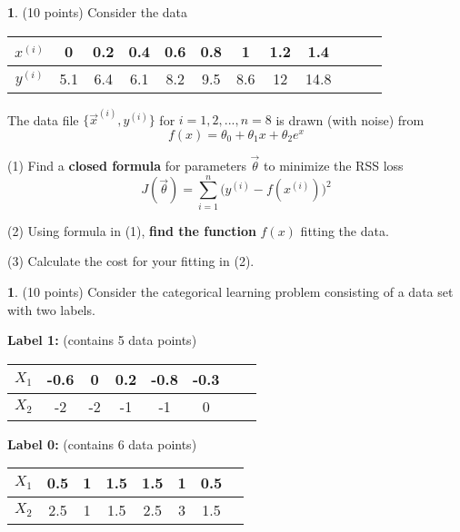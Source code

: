 \documentclass[11pt]{paper}
\theoremstyle{definition}
\newtheorem{Question}[theorem]{ }
\newcommand{\Qu}[1]{
\begin{Question}
#1
\end{Question}
\vspace{-0.5cm}
}
\newcommand{\vx}{\vec{x}}
\begin{document}
 
\vfill





\newpage


 
 \Qu{ (10 points)
 Consider the data 
  \begin{tabular}{c|c|c|c|c|c|c|c|c|c|c|c}
 $x^{(i)}$   &  0 &  0.2&  0.4& 0.6&  0.8& 1&  1.2 & 1.4 \\ \hline
 $y^{(i)}$  &  5.1  & 6.4& 6.1 & 8.2& 9.5  &  8.6  & 12 & 14.8\\
\end{tabular}
 
The  data file $\{ \vx^{(i)}, y^{(i)} \}$ for $i=1,2,...,n=8$  is drawn (with noise) from
 $$f(x)=\theta_0+\theta_1 x+\theta_2 e^x $$

}

 (1) Find a \textbf{closed formula} for parameters $\vec\theta$ to minimize the RSS loss
 $$J(\vec\theta)=\sum_{i=1}^n \big(y^{(i)}-f(x^{(i)})\big)^2 $$
  

 \vfill

 

(2)  Using formula in (1),
\textbf{find the function} $f(x)$ fitting the data.
 
  \vfill
 
(3) Calculate the cost for your fitting in (2). 
 
   \vfill
 
 \newpage

 
  
  
  
   
 
\Qu{ (10 points) Consider the categorical learning problem consisting of a data set with two labels.
 
 
 
 \textbf{Label 1: } (contains 5 data  points)
 
 
\begin{tabular}{c|c|c|c|c|c|c|c}
 $X_1$   & -0.6 &    0 &0.2 &-0.8 &-0.3 \\ \hline
 $X_2$   &  -2&  -2  &-1 & -1 & 0 \\
\end{tabular} 
 
 
\textbf{Label 0: } (contains 6 data  points)
 
\begin{tabular}{c|c|c|c|c|c|c|c}
 $X_1$    & 0.5  & 1 &1.5 & 1.5 & 1  & 0.5     \\ \hline
 $X_2$    &  2.5 & 1  & 1.5 & 2.5 &3   &1.5  \\
\end{tabular}
 
  
 }
 
\end{document}
